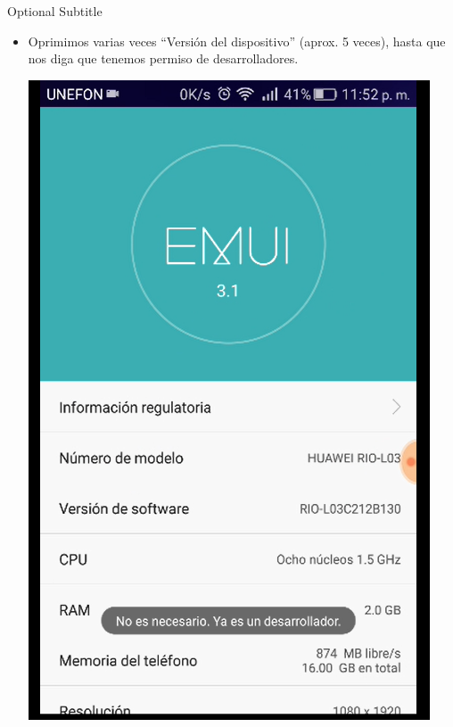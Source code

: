 \documentclass{beamer}
\begin{document}
\begin{frame}{35}{Optional Subtitle}
  \begin{itemize}
  \item {
    Oprimimos varias veces “Versión del dispositivo” (aprox. 5 veces), hasta que nos diga que tenemos permiso de desarrolladores.
  }
  
  \includegraphics[height=0.6\paperheight]{image/IU35}
  \centering
  \end{itemize}
\end{frame}
\end{document}
